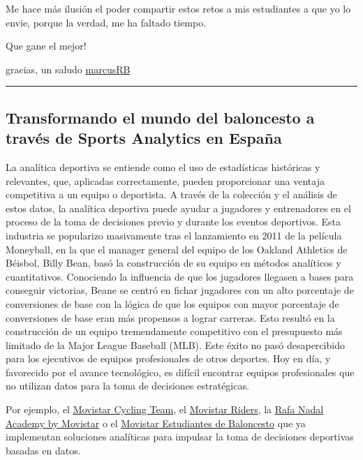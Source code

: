 \documentclass[]{article}
\begin{document}
Me hace más ilusión el poder compartir estos retos a mis estudiantes a
que yo lo envie, porque la verdad, me ha faltado tiempo.

Que gane el mejor!

gracias, un saludo \href{www.marcusrb.com}{marcusRB}

\begin{center}\rule{0.5\linewidth}{\linethickness}\end{center}

\subsection{Transformando el mundo del baloncesto a través de Sports
Analytics en
España}\label{transformando-el-mundo-del-baloncesto-a-traves-de-sports-analytics-en-espana}

La analítica deportiva se entiende como el uso de estadísticas
históricas y relevantes, que, aplicadas correctamente, pueden
proporcionar una ventaja competitiva a un equipo o deportista. A través
de la colección y el análisis de estos datos, la analítica deportiva
puede ayudar a jugadores y entrenadores en el proceso de la toma de
decisiones previo y durante los eventos deportivos. Esta industria se
popularizo masivamente tras el lanzamiento en 2011 de la película
Moneyball, en la que el manager general del equipo de los Oakland
Athletics de Béisbol, Billy Bean, basó la construcción de su equipo en
métodos analíticos y cuantitativos. Conociendo la influencia de que los
jugadores llegasen a bases para conseguir victorias, Beane se centró en
fichar jugadores con un alto porcentaje de conversiones de base con la
lógica de que los equipos con mayor porcentaje de conversiones de base
eran más propensos a lograr carreras. Esto resultó en la construcción de
un equipo tremendamente competitivo con el presupuesto más limitado de
la Major League Baseball (MLB). Este éxito no pasó desapercibido para
los ejecutivos de equipos profesionales de otros deportes. Hoy en día, y
favorecido por el avance tecnológico, es difícil encontrar equipos
profesionales que no utilizan datos para la toma de decisiones
estratégicas.

Por ejemplo, el
\href{https://www.youtube.com/watch?v=LEreBnaDW2A}{Movistar Cycling
Team}, el
\href{https://luca-d3.com/sports-analytics-2/index.html}{Movistar
Riders}, la
\href{https://www.elmundo.es/promociones/native/2018/06/02/index.html}{Rafa
Nadal Academy by Movistar} o el
\href{https://luca-d3.com/sports-analytics-2/index.html}{Movistar
Estudiantes de Baloncesto} que ya implementan soluciones analíticas para
impulsar la toma de decisiones deportivas basadas en datos.
\end{document}
